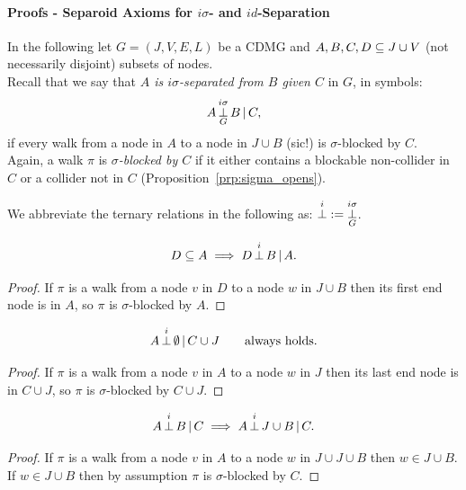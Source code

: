 \paragraph{Proofs - Separoid Axioms for $i\sigma$- and $id$-Separation}\hfill%

In the following let $G=(J,V,E,L)$ be a CDMG and $A,B,C,D \subseteq J \cup V$
(not necessarily disjoint) subsets of nodes.\\

Recall that we say that \emph{$A$ is $i\sigma$-separated from $B$ given $C$} in $G$, in symbols:
    \[ A \operatorname*{\perp}^{i\sigma}_G B \operatorname*{|} C, \]
 if every walk from a node in $A$ to a node in $J \cup B$ (sic!) is $\sigma$-blocked by $C$. \\
 Again, a walk $\pi$ is \emph{$\sigma$-blocked by $C$} if it either contains a blockable non-collider in $C$ or a collider not in $C$ (Proposition~\ref{prp:sigma_opens}).

 We abbreviate the ternary relations in the following as: $\displaystyle \operatorname*{\perp}^i := \operatorname*{\perp}^{i\sigma}_G$.


\begin{Lem}
    \[D \subseteq A \implies D \operatorname*{\perp}^i  B \operatorname*{|} A.\]
\begin{proof}
    If $\pi$ is a walk from a node $v$ in $D$ to a node $w$ in $J \cup B$ then its first end node is in $A$, so $\pi$ is $\sigma$-blocked by $A$.
\end{proof}
\end{Lem}

\begin{Lem}
    \label{s-sep-restricted-right-redundancy}
    \[A \operatorname*{\perp}^i  \emptyset \operatorname*{|} C \cup J \qquad \text{always holds.}\]
\begin{proof}
    If $\pi$ is a walk from a node $v$ in $A$ to a node $w$ in $J$ then its last end node is in $C \cup J$, so $\pi$ is $\sigma$-blocked by $C \cup J$.
\end{proof}
\end{Lem}


\begin{Lem}
    \[A \operatorname*{\perp}^i  B \operatorname*{|} C \implies A \operatorname*{\perp}^i  J \cup B \operatorname*{|} C.\]
\begin{proof}
 If $\pi$ is a walk from a node $v$ in $A$ to a node $w$ in $J \cup J \cup B$ then $w \in J \cup B$. %
 If $w \in J \cup B$ then by assumption $\pi$ is $\sigma$-blocked by $C$.
\end{proof}
\end{Lem}


